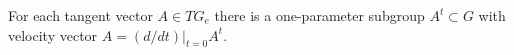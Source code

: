 For each tangent vector $A \in TG_e$ there is a one-parameter subgroup $A^t \subset G$ with velocity vector $A = (d/dt)|_{t=0} A^t$.
